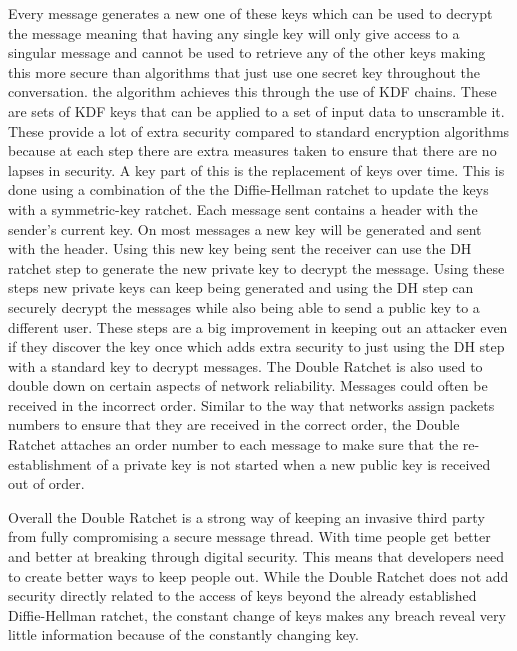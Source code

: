 \documentclass{article}
\begin{document}
Every message generates a new one of these keys which can be used to decrypt the message meaning that having any single key will only give access to a singular message and cannot be used to retrieve any of the other keys making this more secure than algorithms that just use one secret key throughout the conversation. the algorithm achieves this through the use of KDF chains. These are sets of KDF keys that can be applied to a set of input data to unscramble it. These provide a lot of extra security compared to standard encryption algorithms because at each step there are extra measures taken to ensure that there are no lapses in security. A key part of this is the replacement of keys over time. This is done using a combination of the the Diffie-Hellman ratchet to update the keys with a symmetric-key ratchet. Each message sent contains a header with the sender's current key. On most messages a new key will be generated and sent with the header. Using this new key being sent the receiver can use the DH ratchet step to generate the new private key to decrypt the message. Using these steps new private keys can keep being generated and using the DH step can securely decrypt the messages while also being able to send a public key to a different user. These steps are a big improvement in keeping out an attacker even if they discover the key once which adds extra security to just using the DH step with a standard key to decrypt messages.\newline
 The Double Ratchet is also used to double down on certain aspects of network reliability. Messages could often be received in the incorrect order. Similar to the way that networks assign packets numbers to ensure that they are received in the correct order, the Double Ratchet attaches an order number to each message to make sure that the re-establishment of a private key is not started when a new public key is received out of order.\newline
 
Overall the Double Ratchet is a strong way of keeping an invasive third party from fully compromising a secure message thread. With time people get better and better at breaking through digital security. This means that developers need to create better ways to keep people out. While the Double Ratchet does not add security directly related to the access of keys beyond the already established Diffie-Hellman ratchet, the constant change of keys makes any breach reveal very little information because of the constantly changing key.\newline
 
\end{document}
